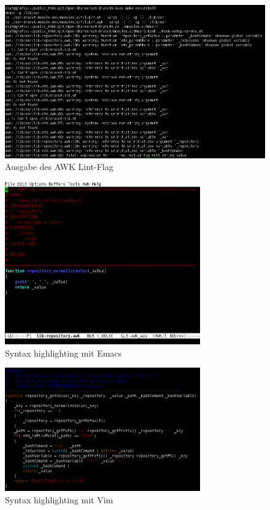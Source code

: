 \documentclass[10pt,a4paper]{article}
\begin{document}
\begin{figure}[H]
 \centering
 \includegraphics[width=1.0\textwidth]{./awk-lint.png}
 \caption[]{Ausgabe des AWK Lint-Flag}
 \label{pic:lint} 
\end{figure}

\begin{figure}[H]
 \centering
 \includegraphics[width=0.75\textwidth]{./awk-emacs.png}
 \caption[]{Syntax highlighting mit Emacs}
 \label{pic:emacs} 
\end{figure}


\begin{figure}[H]
 \centering
 \includegraphics[width=0.75\textwidth]{./awk-vim.png}
 \caption[]{Syntax highlighting mit Vim}
 \label{pic:vim} 
\end{figure}
\end{document}
